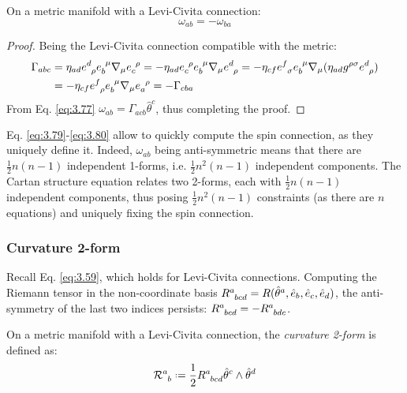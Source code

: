 \begin{proposition}
  On a metric manifold with a Levi-Civita connection:
  \begin{equation}
    \omega_{ab} = -\omega_{ba}
    \label{eq:3.80}
  \end{equation}
\end{proposition}
\begin{proof}
  Being the Levi-Civita connection compatible with the metric:
  \begin{equation*}
    \begin{split}
      \Gamma_{abc}
      &= \eta_{ad} \tensor{e}{^d_\rho} \tensor{e}{_b^\mu} \na_\mu \tensor{e}{_c^\rho} = -\eta_{ad} \tensor{e}{_c^\rho} \tensor{e}{_b^\mu} \na_\mu \tensor{e}{^d_\rho} = -\eta_{cf} \tensor{e}{^f_\sigma} \tensor{e}{_b^\mu} \na_\mu (\eta_{ad} g^{\rho \sigma} \tensor{e}{^d_\rho}) \\
      &= -\eta_{cf} \tensor{e}{^f_\rho} \tensor{e}{_b^\mu} \na_\mu \tensor{e}{_a^\rho} = -\Gamma_{cba}
    \end{split}
  \end{equation*}
  From Eq. \ref{eq:3.77} $ \omega_{ab} = \Gamma_{acb} \hat{\theta}^c $, thus completing the proof.
\end{proof}

Eq. \ref{eq:3.79}-\ref{eq:3.80} allow to quickly compute the spin connection, as they uniquely define it. Indeed, $ \omega_{ab} $ being anti-symmetric means that there are $ \frac{1}{2} n (n-1) $ independent 1-forms, i.e. $ \frac{1}{2} n^2 (n-1) $ independent components. The Cartan structure equation relates two 2-forms, each with $ \frac{1}{2} n (n-1) $ independent components, thus posing $ \frac{1}{2} n^2 (n-1) $ constraints (as there are $ n $ equations) and uniquely fixing the spin connection.

\subsubsection{Curvature 2-form}

Recall Eq. \ref{eq:3.59}, which holds for Levi-Civita connections. Computing the Riemann tensor in the non-coordinate basis $ \tensor{R}{^a_{bcd}} = R(\hat{\theta}^a, \hat{e}_b, \hat{e}_c, \hat{e}_d) $, the anti-symmetry of the last two indices persists: $ \tensor{R}{^a_{bcd}} = -\tensor{R}{^a_{bdc}} $.

\begin{definition}
  On a metric manifold with a Levi-Civita connection, the \textit{curvature 2-form} is defined as:
  \begin{equation}
    \tensor{\mathcal{R}}{^a_b} \defeq \frac{1}{2} \tensor{R}{^a_{bcd}} \hat{\theta}^c \wedge \hat{\theta}^d
    \label{eq:3.81}
  \end{equation}
\end{definition}

